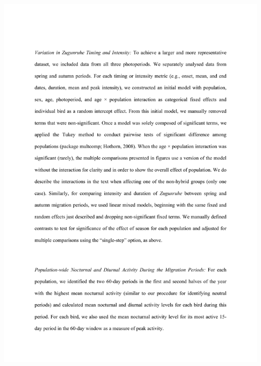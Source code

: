 \documentclass[a4paper, twoside]{templates/ociamthesis}
\begin{document}
\includegraphics[width=1\linewidth]{pdf_chapters/zug/zug_supp_crop_Part7}
\end{document}
